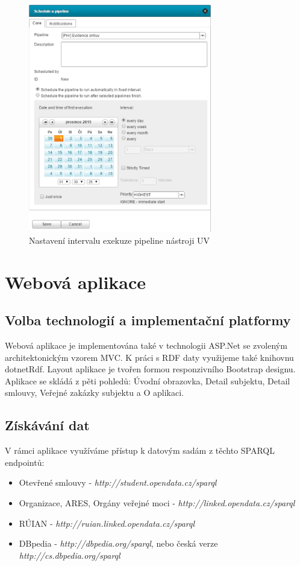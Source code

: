 \begin{figure}[H]
\centerline{\includegraphics[width=80mm]{img/unvSchedule.eps}}
\caption{Nastavení intervalu exekuze pipeline nástroji UV}
\label{obr:unvSchedule}
\end{figure}

\section{Webová aplikace}

\subsection{Volba technologií a implementační platformy}

Webová aplikace je implementována také v technologii ASP.Net se zvoleným architektonickým vzorem MVC. K práci s RDF daty využijeme také knihovnu dotnetRdf. Layout aplikace je tvořen formou responzivního Bootstrap designu. Aplikace se skládá z pěti pohledů: Úvodní obrazovka, Detail subjektu, Detail smlouvy, Veřejné zakázky subjektu a O aplikaci.

\subsection{Získávání dat}

V rámci aplikace využíváme přístup k datovým sadám z těchto SPARQL endpointů:

\begin{itemize}
\item Otevřené smlouvy - \textit{http://student.opendata.cz/sparql}
\item Organizace, ARES, Orgány veřejné moci - \textit{http://linked.opendata.cz/sparql}
\item RÚIAN - \textit{http://ruian.linked.opendata.cz/sparql}
\item DBpedia - \textit{http://dbpedia.org/sparql}, nebo česká verze \\\textit{http://cs.dbpedia.org/sparql}
\end{itemize}

